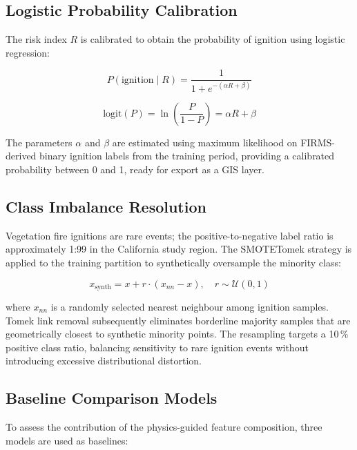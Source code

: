 \documentclass[conference]{IEEEtran}
\begin{document}
\subsection{Logistic Probability Calibration}

The risk index $R$ is calibrated to obtain the probability of ignition using logistic regression:

\begin{equation}
P(\mathrm{ignition} \mid R) = \frac{1}{1 + e^{-(\alpha R + \beta)}}
\label{eq:logistic}
\end{equation}

\begin{equation}
\mathrm{logit}(P) = \ln\!\left(\frac{P}{1-P}\right) = \alpha R + \beta
\end{equation}

The parameters $\alpha$ and $\beta$ are estimated using maximum likelihood on FIRMS-derived binary ignition labels from the training period, providing a calibrated probability between 0 and 1, ready for export as a GIS layer.

\subsection{Class Imbalance Resolution}

Vegetation fire ignitions are rare events; the positive-to-negative label ratio is
approximately 1:99 in the California study region. The SMOTETomek strategy is applied
to the training partition to synthetically oversample the minority class:

\begin{equation}
x_{\mathrm{synth}} = x + r \cdot (x_{nn} - x), \quad r \sim \mathcal{U}(0,1)
\end{equation}

where $x_{nn}$ is a randomly selected nearest neighbour among ignition samples.
Tomek link removal subsequently eliminates borderline majority samples that are
geometrically closest to synthetic minority points. The resampling targets a
10\,\% positive class ratio, balancing sensitivity to rare ignition events without
introducing excessive distributional distortion.

\subsection{Baseline Comparison Models}

To assess the contribution of the physics-guided feature composition, three models are used as baselines:
\end{document}

